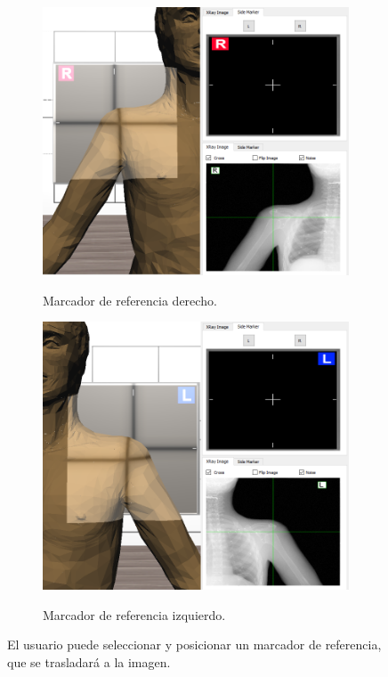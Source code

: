 \begin{figure}[h]
    \begin{subfigure}[b]{0.45\linewidth}
        \centering
        {\includegraphics[width=\linewidth]{IMG/Rside.png}}
        \caption{Marcador de referencia derecho.}
    \end{subfigure}
    \null\hfill
     \begin{subfigure}[b]{0.45\linewidth}
        \centering
        {\includegraphics[width=\linewidth]{IMG/Lside.png}}
        \caption{Marcador de referencia izquierdo.}
    \end{subfigure}
    \caption{\label{fig:side} El usuario puede seleccionar y posicionar un marcador de referencia, que se trasladará a la imagen.}
   \end{figure}




